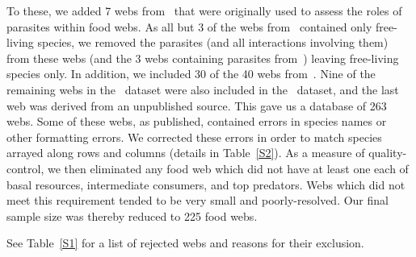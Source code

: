 \documentclass[12pt]{article}
\begin{document}
  To these, we added 7 webs from~\cite{Dunne2013} that were originally used
  to assess the roles of parasites within food webs. As all but 3 of the webs
  from~\cite{GlobalWeb} contained only free-living species, we removed
  the parasites (and all interactions involving them) from these webs (and the
  3 webs containing parasites from~\cite{GlobalWeb}) leaving free-living
  species only. In addition, we included 30 of the 40 webs
  from~\cite{Riede2011}. Nine of the
  remaining webs in the~\cite{Riede2011} dataset were also included in
  the~\cite{GlobalWeb}  dataset, and the last web was derived from an
  unpublished source. This gave us a database of 263 webs. 
  Some of these webs, as published, contained errors in species names or other formatting errors. We corrected these errors in order to match species arrayed along rows and columns (details in Table~\ref{S2}). As a measure of
  quality-control, we then eliminated any food web which did not have at least
  one each of basal resources, intermediate consumers, and top predators. Webs
  which did not meet this requirement tended to be very small and poorly-resolved.
  Our final sample size was thereby reduced to 225 food webs.

 See Table~\ref{S1} for a list of rejected webs and reasons for their
  exclusion. 
  \clearpage
\end{document}
